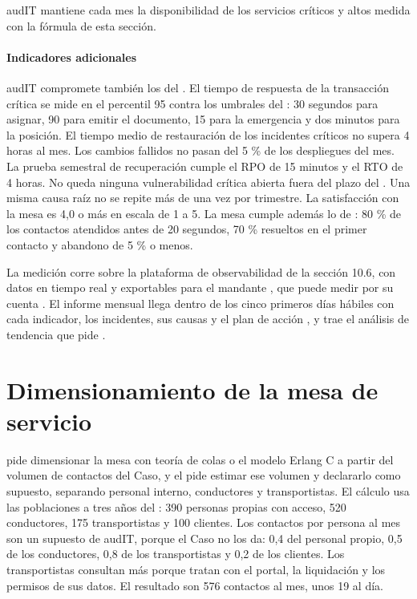 \begin{compromiso}[metrica={99,9 \% mensual en los cuatro servicios críticos y 99,5 \% en los altos},
                   verifica={Informe mensual de nivel de servicio y medición propia del mandante},
                   fuente={\art{78.2}{40} y \caso{RT-21.06}{34}}]
audIT mantiene cada mes la disponibilidad de los servicios críticos y altos medida con la fórmula de esta sección.
\end{compromiso}

\paragraph{Indicadores adicionales} audIT compromete también los del . El tiempo de
respuesta de la transacción crítica se mide en el percentil 95 contra los umbrales del
: 30 segundos para asignar, 90 para emitir el documento, 15 para la emergencia y dos
minutos para la posición. El tiempo medio de restauración de los incidentes críticos no supera 4 horas
al mes. Los cambios fallidos no pasan del 5 \% de los despliegues del mes. La prueba semestral de
recuperación cumple el RPO de 15 minutos y el RTO de 4 horas. No queda ninguna vulnerabilidad crítica
abierta fuera del plazo del . Una misma causa raíz no se repite más de una vez por
trimestre. La satisfacción con la mesa es 4,0 o más en escala de 1 a 5. La mesa cumple además lo de
: 80 \% de los contactos atendidos antes de 20 segundos, 70 \% resueltos en el
primer contacto y abandono de 5 \% o menos.

La medición corre sobre la plataforma de observabilidad de la sección 10.6, con datos en tiempo real y
exportables para el mandante , que puede medir por su cuenta . El informe
mensual llega dentro de los cinco primeros días hábiles con cada indicador, los incidentes, sus causas
y el plan de acción , y trae el análisis de tendencia que pide .

\section{Dimensionamiento de la mesa de servicio}\label{sec:10-dimensionamiento-de-la-mesa-de-s}

 pide dimensionar la mesa con teoría de colas o el modelo Erlang C a partir del
volumen de contactos del Caso, y el  pide estimar ese volumen y declararlo como
supuesto, separando personal interno, conductores y transportistas. El cálculo usa las poblaciones a
tres años del : 390 personas propias con acceso, 520 conductores, 175
transportistas y 100 clientes. Los contactos por persona al mes son un supuesto de audIT, porque el
Caso no los da: 0,4 del personal propio, 0,5 de los conductores, 0,8 de los transportistas y 0,2 de los
clientes. Los transportistas consultan más porque tratan con el portal, la liquidación y los permisos
de sus datos. El resultado son 576 contactos al mes, unos 19 al día.

